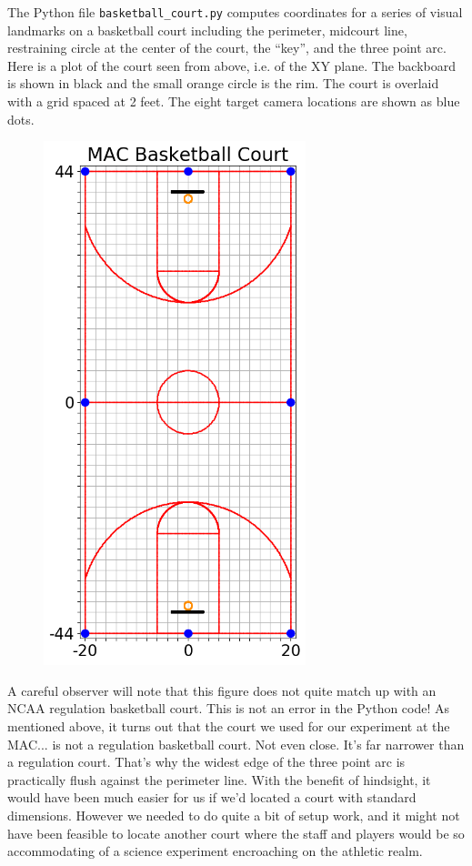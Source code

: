 \documentclass{article}
\begin{document}
The Python file \texttt{basketball\_court.py} computes coordinates for a series of visual landmarks on a
basketball court including the perimeter, midcourt line, restraining circle at the center of the court,
the ``key'', and the three point arc.  Here is a plot of the court seen from above, i.e. of the XY plane.
The backboard is shown in black and the small orange circle is the rim.
The court is overlaid with a grid spaced at 2 feet.  The eight target camera locations are shown as blue dots.
\begin{figure}[H]
\center
\includegraphics[width=0.68\textwidth]{court_lines.png}
\end{figure}

A careful observer will note that this figure does not quite match up with an NCAA regulation basketball court.
This is not an error in the Python code!  
As mentioned above, it turns out that the court we used for our experiment at the MAC...
is not a regulation basketball court.  Not even close.  It's far narrower than a regulation court.
That's why the widest edge of the three point arc is practically flush against the perimeter line.
With the benefit of hindsight, it would have been much easier for us if we'd located a court with standard dimensions.
However we needed to do quite a bit of setup work, and it might not have been feasible to locate another court
where the staff and players would be so accommodating of a science experiment encroaching on the athletic realm.
\end{document}
